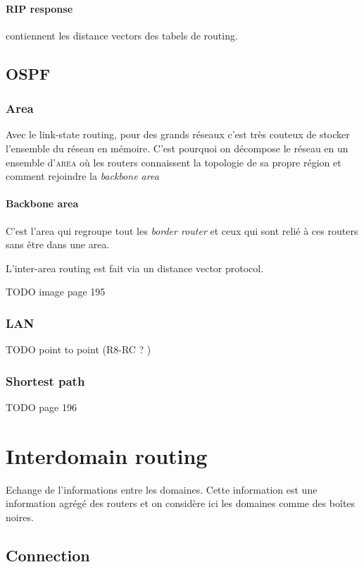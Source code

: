 \documentclass{report}
\begin{document}
\paragraph{RIP response} contiennent les distance vectors des tabels de routing.

\subsection{OSPF}

\subsubsection{Area}
Avec le link-state routing, pour des grands réseaux c'est très couteux de stocker
l'ensemble du réseau en mémoire. C'est pourquoi on décompose le réseau en un 
ensemble d'\textsc{area} où les routers connaissent la topologie de sa propre
région et comment rejoindre la \textit{backbone area}

\paragraph{Backbone area}
C'est l'area qui regroupe tout les \textit{border router} et ceux qui sont relié
à ces routers sans être dans une area.

L'inter-area routing est fait via un distance vector protocol.

TODO image page 195

\subsubsection{LAN}
TODO point to point (R8-RC ? )

\subsubsection{Shortest path}
TODO page 196

\section{Interdomain routing}
Echange de l'informations entre les domaines. Cette information est une information
agrégé des routers et on considère ici les domaines comme des boîtes noires.

\subsection{Connection}
\end{document}
